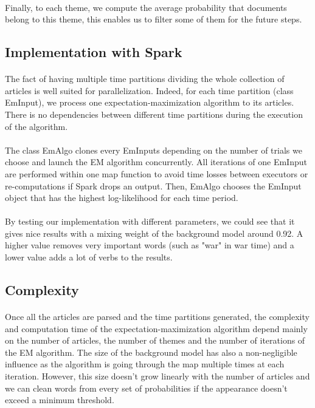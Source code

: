 \paragraph{}
Finally, to each theme, we compute the average probability that documents belong to this theme, this enables us to filter some of them for the future steps.

\subsection{Implementation with Spark}

\paragraph{}
The fact of having multiple time partitions dividing the whole collection of articles is well suited for parallelization. Indeed, for each time partition (class EmInput), we process one expectation-maximization algorithm to its articles. There is no dependencies between different time partitions during the execution of the algorithm.

\paragraph{}
The class EmAlgo clones every EmInputs depending on the number of trials we choose and launch the EM algorithm concurrently. All iterations of one EmInput are performed within one map function to avoid time losses between executors or re-computations if Spark drops an output. Then, EmAlgo chooses the EmInput object that has the highest log-likelihood for each time period.

\paragraph{}
By testing our implementation with different parameters, we could see that it gives nice results with a mixing weight of the background model around 0.92. A higher value removes very important words (such as "war" in war time) and a lower value adds a lot of verbs to the results.

\subsection{Complexity}

\paragraph{}
Once all the articles are parsed and the time partitions generated, the complexity and computation time of the expectation-maximization algorithm depend mainly on the number of articles, the number of themes and the number of iterations of the EM algorithm.
The size of the background model has also a non-negligible influence as the algorithm is going through the map multiple times at each iteration. However, this size doesn't grow linearly with the number of articles and we can clean words from every set of probabilities if the appearance doesn't exceed a minimum threshold.

